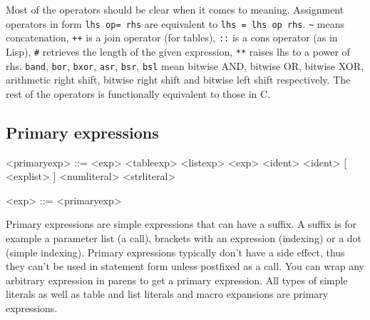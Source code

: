 \documentclass{article}
\newenvironment{bnf}
{
\begin{mdframed}
\begin{grammar}
}
{
\end{grammar}
\end{mdframed}
}
\begin{document}
Most of the operators should be clear when it comes to meaning. Assignment
operators in form \verb|lhs op= rhs| are equivalent to \verb|lhs = lhs op rhs|.
\verb|~| means concatenation, \verb|++| is a join operator (for tables),
\verb|::| is a cons operator (as in Lisp), \verb|#| retrieves the length
of the given expression, \verb|**| raises lhs to a power of rhs. \verb|band|,
\verb|bor|, \verb|bxor|, \verb|asr|, \verb|bsr|, \verb|bsl| mean bitwise AND,
bitwise OR, bitwise XOR, arithmetic right shift, bitwise right shift and
bitwise left shift respectively. The rest of the operators is functionally
equivalent to those in C.
\subsection{Primary expressions}
\begin{bnf}
<primaryexp> ::= \lit{(} <exp> \lit{)}
    \alt <tableexp>
    \alt <listexp>
    \alt \lit{\$(} <exp> \lit{)}
    \alt \lit{\$} <ident>
    \alt <ident> [ \lit{!} \lit{(} <explist> \lit{)} ]
    \alt <numliteral>
    \alt <strliteral>
    \alt {}
    \alt {}
    \alt {}

<exp> ::= <primaryexp>
\end{bnf}
Primary expressions are simple expressions that can have a suffix. A suffix
is for example a parameter list (a call), brackets with an expression
(indexing) or a dot (simple indexing). Primary expressions typically don't
have a side effect, thus they can't be used in statement form unless postfixed
as a call. You can wrap any arbitrary expression in parens to get a primary
expression. All types of simple literals as well as table and list literals
and macro expansions are primary expressions.
\end{document}

